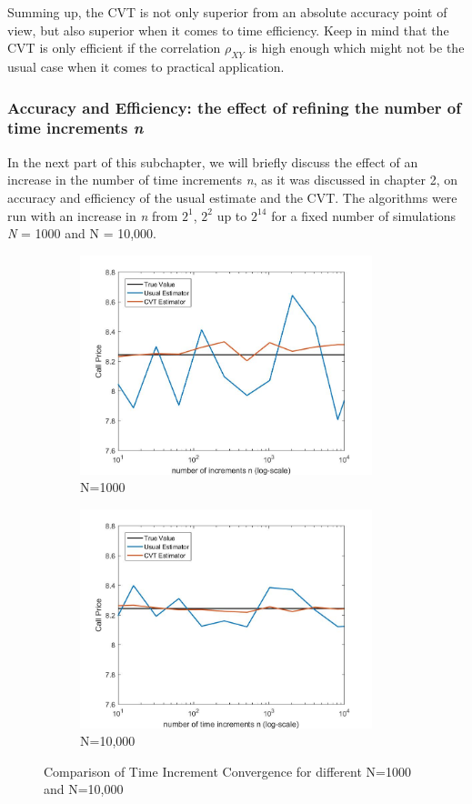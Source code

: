 \documentclass[a4paper,11pt]{article}
\begin{document}
{Summing up, the CVT is not only superior from an absolute accuracy point of view, but also superior when it comes to time efficiency.  Keep in mind that the CVT is only efficient if the correlation $\rho_{XY}$ is high enough which might not be the usual case when it comes to practical application.

\subsubsection{Accuracy and Efficiency: the effect of refining the number of time increments \textit{n}}
In the next part of this subchapter, we will briefly discuss the effect of an increase in the number of time increments \textit{n}, as it was discussed in chapter 2, on accuracy and efficiency of the usual estimate and the CVT. The algorithms were run with an increase in \textit{n} from $2^1$, $2^2$ up to $2^{14}$ for a fixed number of simulations \textit{N} = 1000 and N = 10,000.

\begin{figure}[!h]
\centering
\begin{subfigure}[c]{0.5\textwidth}
\caption*{N=1000}
\includegraphics[width=8.5cm]{plot31.jpeg}
\end{subfigure}
\begin{subfigure}[c]{0.4\textwidth}
\caption*{N=10,000}
\includegraphics[width=8.5cm]{plot32.jpeg}
\end{subfigure}
\caption{Comparison of Time Increment Convergence for different N=1000 and N=10,000}
\label{plot31}
\end{figure}

}
\end{document}
